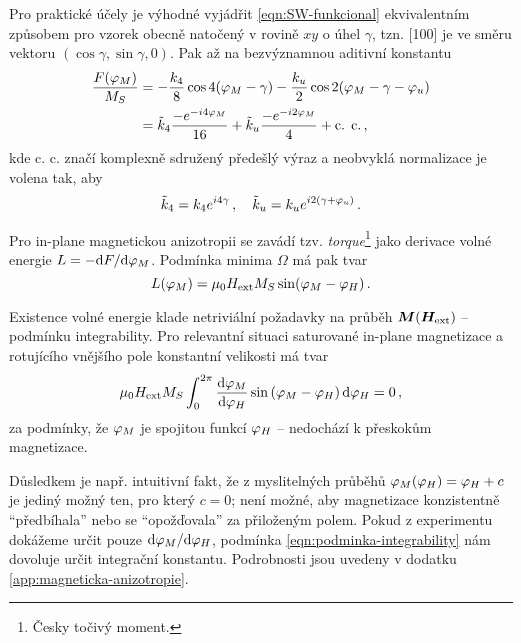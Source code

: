 Pro praktické účely je výhodné vyjádřit \eqref{eqn:SW-funkcional} ekvivalentním způsobem pro vzorek obecně natočený v rovině $xy$ o úhel $\gamma$, tzn. [100] je ve směru vektoru $(\cos\gamma, \sin\gamma, 0)$.
Pak až na bezvýznamnou aditivní konstantu
\begin{subequations}
\label{eqn:funkcional-otoceny}
\begin{align}
    \frac{F(\varphi_M)}{M_S}&=-\frac{k_4}{8} \cos 4(\varphi_M-\gamma)-\frac{k_u}{2} \cos 2(\varphi_M-\gamma-\varphi_u) \\
                        &=\tilde{k}_4 \frac{-e^{-i4\varphi_M}}{16} + \tilde{k}_u \frac{-e^{-i2\varphi_M}}{4} + \textrm{c. c.}\,,
\end{align}
\end{subequations}
kde c. c. značí komplexně sdružený předešlý výraz a neobvyklá normalizace je volena tak, aby
\begin{equation}
\label{eqn:tilda-k}
    \tilde{k}_4 = k_4 e^{i4\gamma} \,, \quad \tilde{k}_u = k_u e^{i2(\gamma+\varphi_u)} \,.
\end{equation}

Pro in-plane magnetickou anizotropii se zavádí tzv. \emph{torque}\footnote{Česky točivý moment.} jako derivace volné energie $L=\allowbreak-\textrm{d}F/\textrm{d}\varphi_M$.
Podmínka minima $\Omega$ má pak tvar
\begin{equation}
    \label{eqn:torque}
    L(\varphi_M) = \mu_0H_\textrm{ext} M_S \sin (\varphi_M-\varphi_H) \,.
\end{equation}

Existence volné energie klade netriviální požadavky na průběh $\bm{M}(\bm{H}_\textrm{ext})$ -- podmínku integrability.
Pro relevantní situaci saturované in-plane magnetizace a rotujícího vnějšího pole konstantní velikosti má tvar
\begin{equation}
\label{eqn:podminka-integrability}
    \mu_0H_\textrm{ext} M_S \int_{0}^{2\pi}  \frac{\text{d}\varphi_M}{\text{d}\varphi_H} \sin\left(\varphi_M-\varphi_H\right) \text{d}\varphi_H=0 \,,
\end{equation}
za podmínky, že $\varphi_M$ je spojitou funkcí $\varphi_H$ -- nedochází k přeskokům magnetizace.

Důsledkem je např. intuitivní fakt, že z myslitelných průběhů $\varphi_M(\varphi_H)=\varphi_H+c$ je jediný možný ten, pro který $c=0$;
není možné, aby magnetizace konzistentně ``předbíhala'' nebo se ``opožďovala'' za přiloženým polem.
Pokud z experimentu dokážeme určit pouze $\text{d}\varphi_M/\text{d}\varphi_H$, podmínka \eqref{eqn:podminka-integrability} nám dovoluje určit integrační konstantu.
Podrobnosti jsou uvedeny v dodatku \ref{app:magneticka-anizotropie}.
